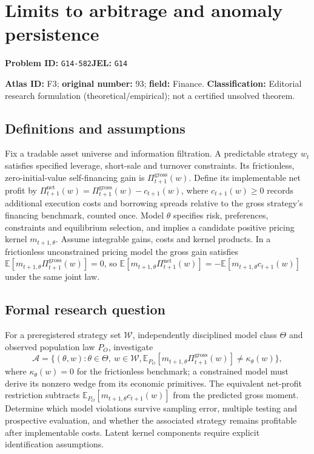 \documentclass[11pt,a4paper]{article}
\begin{document}
\section*{Limits to arbitrage and anomaly persistence}
\textbf{Problem ID:} \texttt{G14-582}\quad \textbf{JEL:} \texttt{G14}\par
\label{problem:OP-0093}
\label{atlas:prob:F3}

\noindent\textbf{Atlas ID:} F3; \textbf{original number:} 93; \textbf{field:} Finance. \textbf{Classification:} Editorial research formulation (theoretical/empirical); not a certified unsolved theorem.

\subsection*{Definitions and assumptions}
Fix a tradable asset universe and information filtration. A predictable strategy $w_t$ satisfies specified leverage, short-sale and turnover constraints. Its frictionless, zero-initial-value self-financing gain is $\Pi^{\mathrm{gross}}_{t+1}(w)$. Define its implementable net profit by $\Pi^{\mathrm{net}}_{t+1}(w)=\Pi^{\mathrm{gross}}_{t+1}(w)-c_{t+1}(w)$, where $c_{t+1}(w)\ge0$ records additional execution costs and borrowing spreads relative to the gross strategy's financing benchmark, counted once. Model $\theta$ specifies risk, preferences, constraints and equilibrium selection, and implies a candidate positive pricing kernel $m_{t+1,\theta}$. Assume integrable gains, costs and kernel products. In a frictionless unconstrained pricing model the gross gain satisfies $\mathbb E[m_{t+1,\theta}\Pi^{\mathrm{gross}}_{t+1}(w)]=0$, so $\mathbb E[m_{t+1,\theta}\Pi^{\mathrm{net}}_{t+1}(w)]=-\mathbb E[m_{t+1,\theta}c_{t+1}(w)]$ under the same joint law.

\subsection*{Formal research question}
For a preregistered strategy set $\mathcal W$, independently disciplined model class $\Theta$ and observed population law $P_O$, investigate
\[
 \mathcal A=\{(\theta,w):\theta\in\Theta,\ w\in\mathcal W,
  \mathbb E_{P_O}[m_{t+1,\theta}\Pi^{\mathrm{gross}}_{t+1}(w)]
   \ne\kappa_\theta(w)\},
\]
where $\kappa_\theta(w)=0$ for the frictionless benchmark; a constrained model must derive its nonzero wedge from its economic primitives. The equivalent net-profit restriction subtracts $\mathbb E_{P_O}[m_{t+1,\theta}c_{t+1}(w)]$ from the predicted gross moment. Determine which model violations survive sampling error, multiple testing and prospective evaluation, and whether the associated strategy remains profitable after implementable costs. Latent kernel components require explicit identification assumptions.
\end{document}
